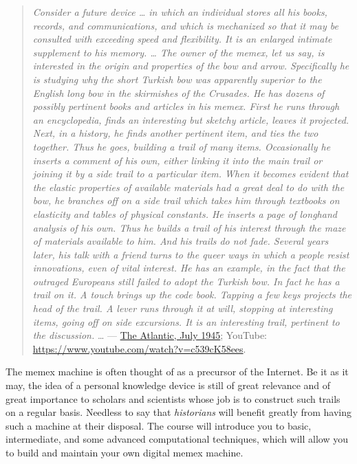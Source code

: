 \documentclass[
]{book}
\begin{document}
\begin{quote}
\emph{Consider a future device \ldots{} in which an individual stores all his books, records, and communications, and which is mechanized so that it may be consulted with exceeding speed and flexibility. It is an enlarged intimate supplement to his memory. \ldots{} The owner of the memex, let us say, is interested in the origin and properties of the bow and arrow. Specifically he is studying why the short Turkish bow was apparently superior to the English long bow in the skirmishes of the Crusades. He has dozens of possibly pertinent books and articles in his memex. First he runs through an encyclopedia, finds an interesting but sketchy article, leaves it projected. Next, in a history, he finds another pertinent item, and ties the two together. Thus he goes, building a trail of many items. Occasionally he inserts a comment of his own, either linking it into the main trail or joining it by a side trail to a particular item. When it becomes evident that the elastic properties of available materials had a great deal to do with the bow, he branches off on a side trail which takes him through textbooks on elasticity and tables of physical constants. He inserts a page of longhand analysis of his own. Thus he builds a trail of his interest through the maze of materials available to him. And his trails do not fade. Several years later, his talk with a friend turns to the queer ways in which a people resist innovations, even of vital interest. He has an example, in the fact that the outraged Europeans still failed to adopt the Turkish bow. In fact he has a trail on it. A touch brings up the code book. Tapping a few keys projects the head of the trail. A lever runs through it at will, stopping at interesting items, going off on side excursions. It is an interesting trail, pertinent to the discussion.} \ldots{} --- \href{https://www.theatlantic.com/magazine/archive/1945/07/as-we-may-think/303881/}{The Atlantic, July 1945}; YouTube: \url{https://www.youtube.com/watch?v=c539cK58ees}.
\end{quote}

The memex machine is often thought of as a precursor of the Internet. Be it as it may, the idea of a personal knowledge device is still of great relevance and of great importance to scholars and scientists whose job is to construct such trails on a regular basis. Needless to say that \emph{historians} will benefit greatly from having such a machine at their disposal. The course will introduce you to basic, intermediate, and some advanced computational techniques, which will allow you to build and maintain your own digital memex machine.
\end{document}

